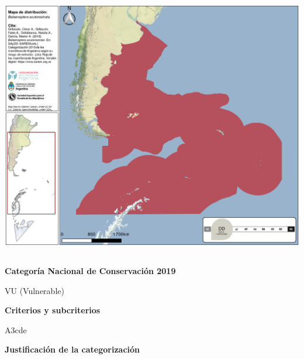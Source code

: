 \documentclass[
  x11names]{article}
\begin{document}
\includegraphics[width=1\linewidth]{maps/Cetartiodactyla/Balaenoptera_acutorostrata}

%
\begin{table}[H]
\centering
\begin{tabular}[t]{>{\raggedright\arraybackslash}m{16cm}>{}m{16cm}}
\toprule
\cellcolor{ceil}{\textcolor{white}{\textbf{\rule{0pt}{14pt}CATEGORÍAS DE CONSERVACIÓN}}}\\
\bottomrule
\end{tabular}
\end{table}

\vspace{-0.4cm}

\textbf{Categoría Nacional de Conservación 2019}

VU (Vulnerable)

\textbf{Criterios y subcriterios}

A3cde

\textbf{Justificación de la categorización}
\end{document}

